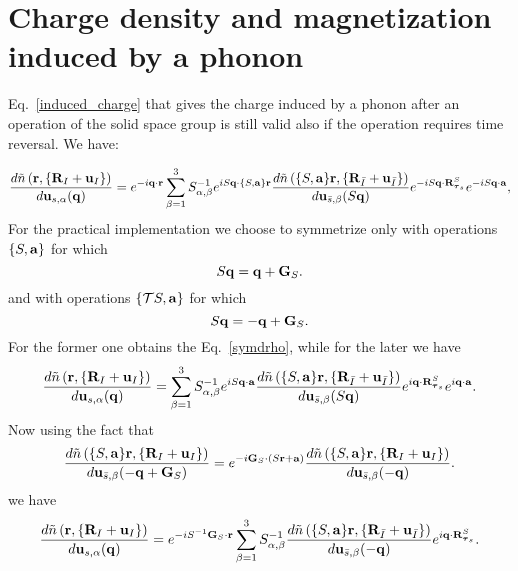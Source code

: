 \documentclass[12pt,a4paper,twoside]{report}
\begin{document}
\section{Charge density and magnetization induced by a phonon}
Eq.~\ref{induced_charge} that gives the charge
induced by a phonon after an operation of the
solid space group is still valid also if the operation requires time reversal. We have: 

\begin{equation}
{d \tilde n\left({\bf r}, \{{\bf R}_I + {\bf u}_I\}\right)
\over d {\bf u}_{s,\alpha}({\bf q})} = e^{-i{\bf q \cdot {\bf r }}} \sum_{\beta=1}^3 S^{-1}_{\alpha,\beta} 
e^{i S {\bf q} \cdot \{S,{\bf a}\} {\bf r }}
{d \tilde n\left(\{S,{\bf a}\} {\bf r}, \{{\bf R}_{\bar I} + {\bf u}_{\bar I}\}\right)
\over d {\bf u}_{\bar s,\beta} (S{\bf q})} e^{-iS{\bf q}\cdot {\bf R}^S_{{\boldsymbol{\tau}_s}}} e^{-iS{\bf q}\cdot {\bf a}},
\label{induced_charge_1}
\end{equation}
For the practical implementation we choose to symmetrize only with operations 
$\{S,{\bf a}\}$ for which
\begin{equation}
S {\bf q} = {\bf q} + {\bf G}_S.
\end{equation}
and with operations
$\{\mathcal{T}S,{\bf a}\}$ for which 
\begin{equation}
S {\bf q} = - {\bf q} + {\bf G}_S.
\end{equation}
For the former one obtains the Eq.~\ref{symdrho}, while for the later we have
\begin{equation}
{d \tilde n\left({\bf r}, \{{\bf R}_I + {\bf u}_I\}\right)
\over d {\bf u}_{s,\alpha}({\bf q})} = \sum_{\beta=1}^3 S^{-1}_{\alpha,\beta} e^{i S {\bf q} \cdot {\bf a}} {d \tilde n\left(\{S,{\bf a}\} {\bf r}, \{{\bf R}_{\bar I} + {\bf u}_{\bar I}\}\right)
\over d {\bf u}_{\bar s,\beta} (S{\bf q})} e^{i{\bf q}\cdot {\bf R}^S_{{\boldsymbol{\tau}_s}}} e^{i{\bf q}\cdot {\bf a}}.
\end{equation}
Now using the fact that 
\begin{equation}
{d \tilde n\left(\{S,{\bf a}\}{\bf r}, \{{\bf R}_I + {\bf u}_I\}\right)
\over d {\bf u}_{\bar s,\beta}(-{\bf q}+{\bf G}_S)} 
= e^{-i{\bf G}_S \cdot (S {\bf r} + {\bf a})}
{d \tilde n\left(\{S,{\bf a}\}{\bf r}, \{{\bf R}_I + {\bf u}_I\}\right)
\over d {\bf u}_{\bar s,\beta}(-{\bf q})}.
\end{equation}
we have
\begin{equation}
{d \tilde n\left({\bf r}, \{{\bf R}_I + {\bf u}_I\}\right)
\over d {\bf u}_{s,\alpha}({\bf q})} 
= e^{-iS^{-1} {\bf G}_S \cdot {\bf r}}
\sum_{\beta=1}^3 S^{-1}_{\alpha,\beta} {d \tilde n\left(\{S,{\bf a}\} {\bf r}, \{{\bf R}_{\bar I} + {\bf u}_{\bar I}\}\right)
\over d {\bf u}_{\bar s,\beta} (-{\bf q})} e^{i{\bf q}\cdot {\bf R}^S_{{\boldsymbol{\tau}_s}}}.
\label{symdrho_one_1}
\end{equation}
\end{document}
